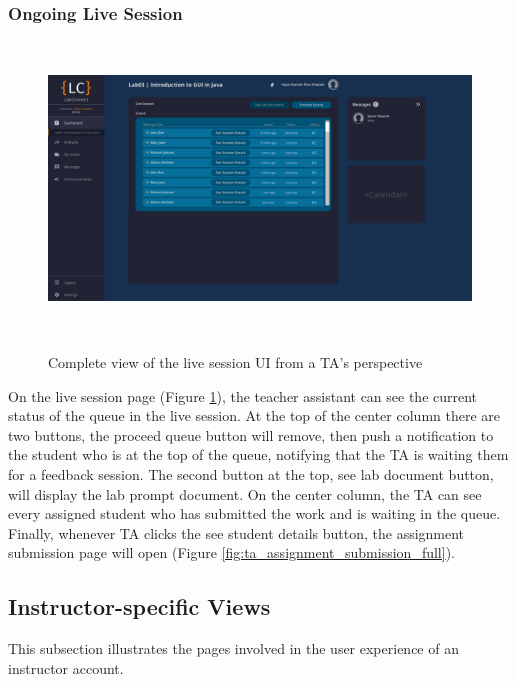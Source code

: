 \documentclass[a4paper, 12pt]{article}
\begin{document}
    \pagebreak

    \subsubsection{Ongoing Live Session}~\label{ta_live_session}

    \begin{figure}[H]
        \centering
        \includegraphics[width=\textwidth]{ta_live_session}
        \caption{Complete view of the live session UI from a TA's perspective}~\label{fig:ta_live_session_full}
    \end{figure}

    On the live session page (Figure \ref{fig:ta_live_session_full}), the teacher assistant can see the current status of the queue in the live session. At the top of the center column there are two buttons,
    the proceed queue button will remove, then push a notification to the student who is at the top of the queue, notifying that the TA is waiting them for a feedback session. The second button at the top,
    see lab document button, will display the lab prompt document. On the center column, the TA can see every assigned student who has submitted the work and is waiting in the queue. Finally, whenever TA clicks the see
    student details button, the assignment submission page will open (Figure \ref{fig:ta_assignment_submission_full}).




    \pagebreak


    \subsection{Instructor-specific Views}

    This subsection illustrates the pages involved in the user experience of an instructor account.
\end{document}
